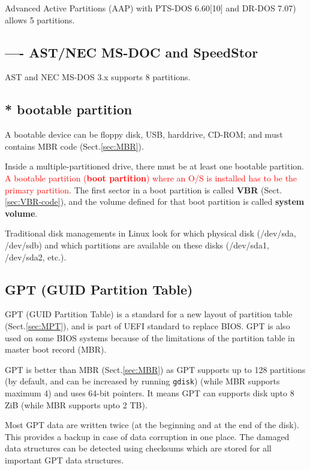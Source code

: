 Advanced Active Partitions (AAP) with PTS-DOS 6.60[10] and DR-DOS 7.07) allows 5
partitions.

\subsection{---- AST/NEC MS-DOC and SpeedStor}

AST and NEC MS-DOS 3.x supports 8 partitions.




\subsection{* bootable partition}

A bootable device can be floppy disk, USB, harddrive, CD-ROM; and must contains
MBR code (Sect.\ref{sec:MBR}).

Inside a multiple-partitioned drive, there must be at least one bootable
partition. \textcolor{red}{A bootable partition ({\bf boot partition}) where an
O/S is installed has to be the primary partition}. The first sector in a boot
partition is called {\bf VBR} (Sect.\ref{sec:VBR-code}), and the volume defined
for that boot partition is called {\bf system volume}.

Traditional disk managements in Linux look for which physical disk (/dev/sda,
/dev/sdb) and which partitions are available on these disks (/dev/sda1,
/dev/sda2, etc.).




\subsection{GPT (GUID Partition Table)}
\label{sec:GPT}

GPT (GUID Partition Table) is a standard for a new layout of partition table
(Sect.\ref{sec:MPT}), and is part of UEFI standard to replace BIOS. 
GPT is also used on some BIOS systems because of the limitations of the
partition table in master boot record (MBR). 

GPT is better than MBR (Sect.\ref{sec:MBR}) as GPT supports up to 128 partitions
(by default, and can be increased by running \verb!gdisk!) (while MBR supports
maximum 4) and uses 64-bit pointers. It means GPT can supports disk upto 8 ZiB
(while MBR supports upto 2 TB).

Most GPT data are written twice (at the beginning and at the end of the disk).
This provides a backup in case of data corruption in one place. The damaged data
structures can be detected using checksums which are stored for all important
GPT data structures.

